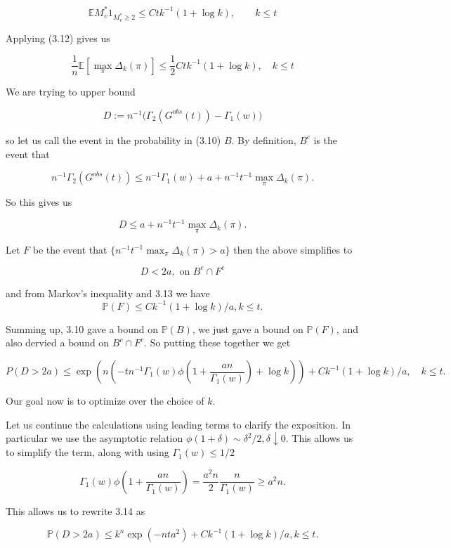 $$ \mathbb{E}M^*_v1_{M_v^* \geq 2}\leq Ctk^{-1}(1+\log k),\qquad k \leq t$$

Applying (3.12) gives us 

\begin{equation}
\frac{1}{n}\mathbb{E}[\max_{\pi}\Delta_k(\pi)] \leq \frac{1}{2}Ctk^{-1}(1+\log k),\quad k \leq t
\end{equation}

We are trying to upper bound 

$$ D:= n^{-1}\big( \Gamma_2(G^{obs}(t)) - \Gamma_1(w)\big)$$

so let us call the event in the probability in (3.10) $B$.  By definition, $B^c$ is the event that 

$$  n^{-1}\Gamma_2(G^{obs}(t)) \leq n^{-1}\Gamma_1(w) + a +n^{-1}t^{-1}\max_{\pi}\Delta_k(\pi).$$

So this gives us

$$ D \leq a + n^{-1}t^{-1}\max_{\pi}\Delta_k(\pi).$$

Let $F$ be the event that $\{n^{-1}t^{-1} \max_{\pi}\Delta_k(\pi) > a\}$ then the above simplifies to 

$$ D < 2a, \text{ on } B^c \cap F^c$$

and from Markov's inequality and 3.13 we have $$\mathbb{P}(F) \leq Ck^{-1}(1+\log k)/a, k \leq t.$$

Summing up, 3.10 gave a bound on $\mathbb{P}(B)$, we just gave a bound on $\mathbb{P}(F)$, and also dervied a bound on $B^c \cap F^c$.  So putting these together we get 

\begin{equation}
P(D > 2a) \leq \exp(n(-tn^{-1}\Gamma_1(w)\phi(1+\frac{an}{\Gamma_1(w)}) + \log k))+Ck^{-1}(1+\log k)/a, \quad k \leq t.
\end{equation}

Our goal now is to optimize over the choice of $k$.  

Let us continue the calculations using leading terms to clarify the exposition.  In particular we use the asymptotic relation $\phi(1+\delta) \sim \delta^2/2, \delta \downarrow 0$.  This allows us to simplify the term, along with using $\Gamma_1(w) \leq 1/2$

$$\Gamma_1(w)\phi(1+\frac{an}{\Gamma_1(w)})= \frac{a^2n}{2}\frac{n}{\Gamma_1(w)}  \geq a^2n .$$

This allows us to rewrite 3.14 as 

\begin{equation}
\mathbb{P}(D > 2a) \leq k^n \exp(-nta^2) + Ck^{-1}(1+\log k)/a, k \leq t.
\end{equation}

